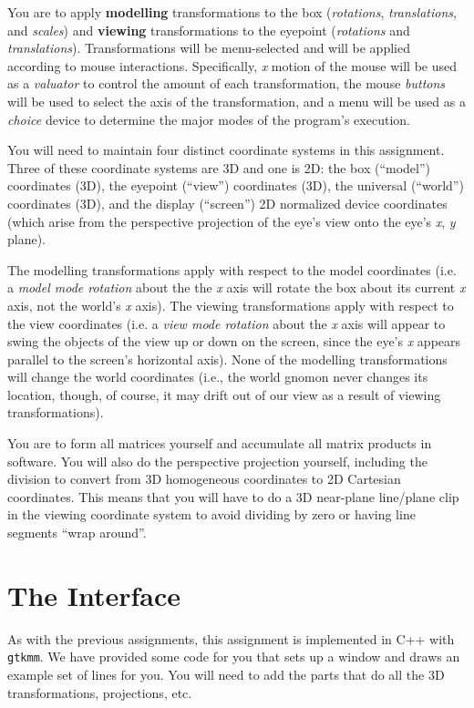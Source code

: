 You are to apply {\bf modelling} transformations to the box
({\it rotations}, {\it translations}, and {\it scales})
and {\bf viewing} transformations to the eyepoint
({\it rotations} and {\it translations}).
Transformations will be menu-selected
and will be applied
according to mouse interactions.
Specifically, {\it x} motion of the mouse will be used
as a {\it valuator} to control the amount of each transformation,
the mouse {\it buttons} will be used to select the axis of the
transformation, and a menu will be used as a {\it choice} device
to determine the major modes of the
program's execution.

You will need to maintain 
four distinct coordinate systems in this assignment.
Three of these coordinate systems are 3D and one is 2D:
the box (``model'') coordinates (3D), the eyepoint (``view'') coordinates (3D),
the universal (``world'') coordinates (3D), and the display (``screen'')
2D normalized device coordinates (which arise from the perspective projection
of the eye's view onto the eye's {\it x}, {\it y\/} plane).

The modelling transformations apply with respect to the
model coordinates (i.e. a {\it model mode rotation} about the the 
{\it x\/} axis
will rotate the box about its current {\it x\/} axis, not the world's
{\it x\/} axis).
The viewing transformations apply with respect to the view coordinates
(i.e. a {\it view mode rotation} about the {\it x\/} axis will appear
to swing the objects of the view up or down on the screen, since
the eye's {\it x\/} appears parallel to the screen's horizontal axis).
None of the modelling transformations will change the world coordinates
(i.e., the world gnomon never changes its location, though, of course,
it may drift out of our view as a result of viewing transformations).

You are to form all matrices yourself and accumulate all matrix products
in software.  You will also do the perspective projection yourself, 
including the division to convert from 3D homogeneous coordinates to 2D
Cartesian coordinates.  This means that you will have to do a 3D near-plane
line/plane clip in the viewing coordinate system to avoid dividing by zero or
having line segments ``wrap around''.

\section{The Interface}

As with the previous assignments, this assignment is implemented in
C++ with \texttt{gtkmm}. We have provided some code for you that sets
up a window and draws an example set of lines for you. You will need
to add the parts that do all the 3D transformations, projections,
etc.

